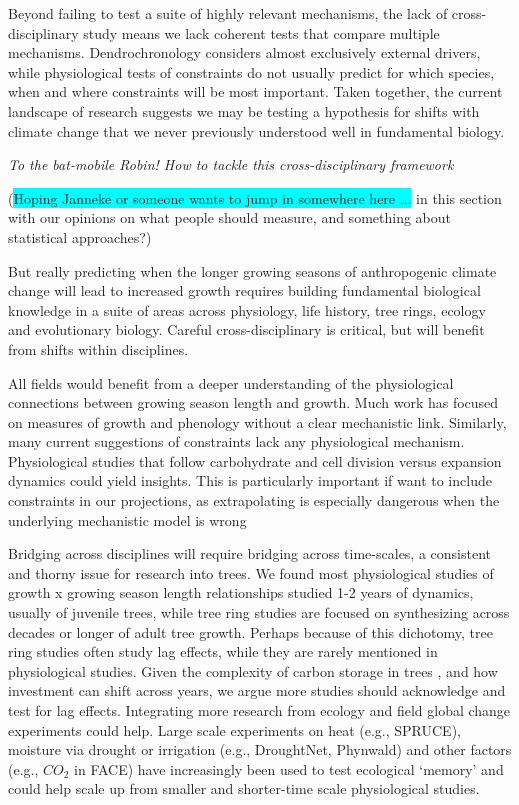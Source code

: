 \documentclass[11pt]{article}
\begin{document}
Beyond failing to test a suite of highly relevant mechanisms, the lack of cross-disciplinary study means we lack coherent tests that compare multiple mechanisms. Dendrochronology considers almost exclusively external drivers, while physiological tests of constraints do not usually predict for which species, when and where constraints will be most important. Taken together, the current landscape of research suggests we may be testing a hypothesis for shifts with climate change that we never previously understood well in fundamental biology. 

\emph{To the bat-mobile Robin! How to tackle this cross-disciplinary framework}





(\colorbox{cyan}{Hoping Janneke or someone wants to jump in somewhere here ...} in this section with our opinions on what people should measure, and something about statistical approaches?)

But really predicting when the longer growing seasons of anthropogenic climate change will lead to increased growth requires building fundamental biological knowledge in a suite of areas across physiology, life history, tree rings, ecology and evolutionary biology. Careful cross-disciplinary is critical, but will benefit from shifts within disciplines. 

All fields would benefit from a deeper understanding of the physiological connections between growing season length and growth. Much work has focused on measures of growth and phenology without a clear mechanistic link. Similarly, many current suggestions of constraints lack any physiological mechanism. Physiological studies that follow carbohydrate and cell division versus expansion dynamics could yield insights. This is particularly important if want to include constraints in our projections, as extrapolating is especially dangerous when the underlying mechanistic model is wrong

Bridging across disciplines will require bridging across time-scales, a consistent and thorny issue for research into trees. We found most physiological studies of growth x growing season length relationships studied 1-2 years of dynamics, usually of juvenile trees, while tree ring studies are focused on synthesizing across decades or longer of adult tree growth. Perhaps because of this dichotomy, tree ring studies often study lag effects, while they are rarely mentioned in physiological studies. Given the complexity of carbon storage in trees \citep{finzi2020,thompson2023no,anderson2022drives}, and how investment can shift across years, we argue more studies should acknowledge and test for lag effects. Integrating more research from ecology and field global change experiments could help. Large scale experiments on heat (e.g., SPRUCE), moisture via drought or irrigation (e.g., DroughtNet, Phynwald) and other factors (e.g., $CO_2$ in FACE) have increasingly been used to test ecological `memory' and could help scale up from smaller and shorter-time scale physiological studies.
\end{document}
